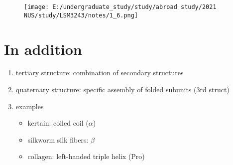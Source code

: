 \begin{figure}[htbp]
	\centering
	\texttt{[image: E:/undergraduate\_study/study/abroad study/2021 NUS/study/LSM3243/notes/1\_6.png]}
\end{figure}

\hypertarget{in-addition-1}{%
	\section{In addition}\label{in-addition-1}}

\begin{enumerate}
	\def\labelenumi{\arabic{enumi}.}
	\item
	tertiary structure: combination of secondary structures
	\item
	quaternary structure: specific assembly of folded subunits (3rd
	struct)
	\item
	examples
	
	\begin{itemize}
		\item
		kertain: coiled coil (\(\alpha\))
		\item
		silkworm silk fibers: \(\beta\)
		\item
		collagen: left-handed triple helix (Pro)
	\end{itemize}
\end{enumerate}